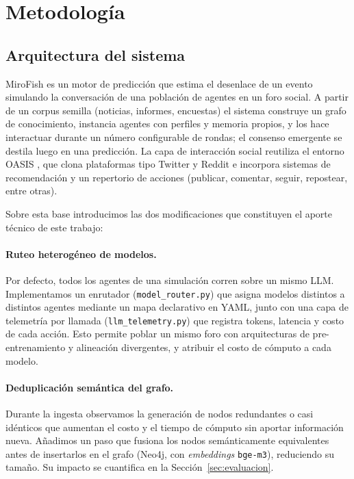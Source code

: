 \documentclass[11pt]{article}
\begin{document}
\section{Metodología}
\label{sec:metodologia}

\subsection{Arquitectura del sistema}

MiroFish \citep{mirofish2025} es un motor de predicción que estima el desenlace de un evento simulando la conversación de una población de agentes en un foro social. A partir de un corpus semilla (noticias, informes, encuestas) el sistema construye un grafo de conocimiento, instancia agentes con perfiles y memoria propios, y los hace interactuar durante un número configurable de rondas; el consenso emergente se destila luego en una predicción. La capa de interacción social reutiliza el entorno OASIS \citep{yang2024oasis}, que clona plataformas tipo Twitter y Reddit e incorpora sistemas de recomendación y un repertorio de acciones (publicar, comentar, seguir, repostear, entre otras).

Sobre esta base introducimos las dos modificaciones que constituyen el aporte técnico de este trabajo:

\paragraph{Ruteo heterogéneo de modelos.} Por defecto, todos los agentes de una simulación corren sobre un mismo LLM. Implementamos un enrutador (\texttt{model\_router.py}) que asigna modelos distintos a distintos agentes mediante un mapa declarativo en YAML, junto con una capa de telemetría por llamada (\texttt{llm\_telemetry.py}) que registra tokens, latencia y costo de cada acción. Esto permite poblar un mismo foro con arquitecturas de pre-entrenamiento y alineación divergentes, y atribuir el costo de cómputo a cada modelo.

\paragraph{Deduplicación semántica del grafo.} Durante la ingesta observamos la generación de nodos redundantes o casi idénticos que aumentan el costo y el tiempo de cómputo sin aportar información nueva. Añadimos un paso que fusiona los nodos semánticamente equivalentes antes de insertarlos en el grafo (Neo4j, con \textit{embeddings} \texttt{bge-m3}), reduciendo su tamaño. Su impacto se cuantifica en la Sección~\ref{sec:evaluacion}.
\end{document}

